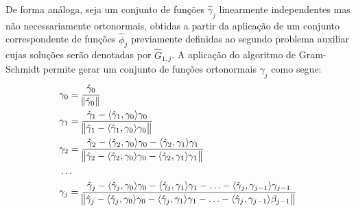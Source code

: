 De forma análoga, seja um conjunto de funções $\hat{\gamma}_j$ linearmente independentes mas não necessariamente ortonormais, obtidas a partir da aplicação de um conjunto correspondente de funções $\hat{\phi}_j$ previamente definidas ao segundo problema auxiliar cujas soluções serão denotadas por $\hat{G}_{1,j}$. A aplicação do algoritmo de Gram-Schmidt permite gerar um conjunto de funções ortonormais $\gamma_j$ como segue:
\begin{align}
& \gamma_0 = \frac{\hat{\gamma}_0}{\norm{\hat{\gamma}_0}} \label{gram_schmidt_05} \\
& \gamma_1
=
\frac{\hat{\gamma}_1 - \langle \hat{\gamma}_1, \gamma_0\rangle\gamma_0}
{\norm{\hat{\gamma}_1 - \langle \hat{\gamma}_1, \gamma_0\rangle\gamma_0}} \label{gram_schmidt_06} \\
& \gamma_2
=
\frac{\hat{\gamma}_2 - \langle \hat{\gamma}_2, \gamma_0\rangle\gamma_0 - \langle \hat{\gamma}_2, \gamma_1\rangle\gamma_1}
{\norm{\hat{\gamma}_2 - \langle \hat{\gamma}_2, \gamma_0\rangle\gamma_0 - \langle \hat{\gamma}_2, \gamma_1\rangle\gamma_1}} \label{gram_schmidt_07} \\
& \ldots \nonumber \\
& \gamma_j
=
\frac{\hat{\gamma}_j - \langle \hat{\gamma}_j, \gamma_0\rangle\gamma_0 - \langle \hat{\gamma}_j, \gamma_1\rangle\gamma_1 - \ldots - \langle \hat{\gamma}_j, \gamma_{j - 1}\rangle\gamma_{j - 1} }
{\norm{\hat{\gamma}_j - \langle \hat{\gamma}_j, \gamma_0\rangle\gamma_0 - \langle \hat{\gamma}_j, \gamma_1\rangle\gamma_1 - \ldots - \langle \hat{\gamma}_j, \gamma_{j - 1}\rangle\beta_{j - 1} }} \label{gram_schmidt_08}
\end{align}

